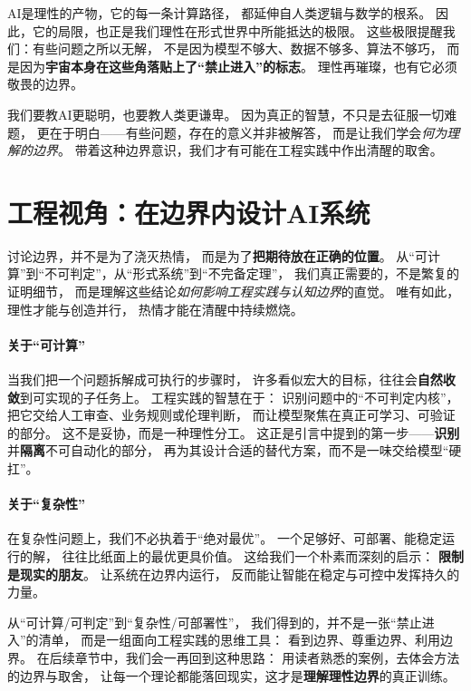AI是理性的产物，它的每一条计算路径，  
都延伸自人类逻辑与数学的根系。  
因此，它的局限，也正是我们理性在形式世界中所能抵达的极限。  
这些极限提醒我们：有些问题之所以无解，  
不是因为模型不够大、数据不够多、算法不够巧，  
而是因为\textbf{宇宙本身在这些角落贴上了“禁止进入”的标志}。  
理性再璀璨，也有它必须敬畏的边界。

我们要教AI更聪明，也要教人类更谦卑。  
因为真正的智慧，不只是去征服一切难题，  
更在于明白——有些问题，存在的意义并非被解答，  
而是让我们学会\textit{何为理解的边界}。  
带着这种边界意识，我们才有可能在工程实践中作出清醒的取舍。

\section*{工程视角：在边界内设计AI系统}

讨论边界，并不是为了浇灭热情，  
而是为了\textbf{把期待放在正确的位置}。  
从“可计算”到“不可判定”，从“形式系统”到“不完备定理”，  
我们真正需要的，不是繁复的证明细节，  
而是理解这些结论\textit{如何影响工程实践与认知边界}的直觉。  
唯有如此，理性才能与创造并行，  
热情才能在清醒中持续燃烧。

\paragraph{关于“可计算”}
当我们把一个问题拆解成可执行的步骤时，  
许多看似宏大的目标，往往会\textbf{自然收敛}到可实现的子任务上。  
工程实践的智慧在于：  
识别问题中的“不可判定内核”，  
把它交给人工审查、业务规则或伦理判断，  
而让模型聚焦在真正可学习、可验证的部分。  
这不是妥协，而是一种理性分工。
这正是引言中提到的第一步——\textbf{识别}并\textbf{隔离}不可自动化的部分，  
再为其设计合适的替代方案，而不是一味交给模型“硬扛”。

\paragraph{关于“复杂性”}
在复杂性问题上，我们不必执着于“绝对最优”。  
一个足够好、可部署、能稳定运行的解，  
往往比纸面上的最优更具价值。  
这给我们一个朴素而深刻的启示：  
\textbf{限制是现实的朋友}。  
让系统在边界内运行，  
反而能让智能在稳定与可控中发挥持久的力量。

从“可计算/可判定”到“复杂性/可部署性”，  
我们得到的，并不是一张“禁止进入”的清单，  
而是一组面向工程实践的思维工具：  
看到边界、尊重边界、利用边界。  
在后续章节中，我们会一再回到这种思路：  
用读者熟悉的案例，去体会方法的边界与取舍，  
让每一个理论都能落回现实，这才是\textbf{理解理性边界}的真正训练。
  
